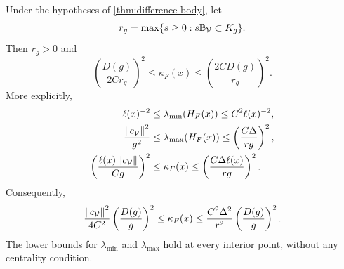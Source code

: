 \begin{theorem}
\label{thm:diameter-law}
Under the hypotheses of \cref{thm:difference-body}, let
\[
 r_g=\max\{s\geq0:s\mathbb B_{\mathcal V}\subset K_g\}.
\]
Then $r_g>0$ and
\begin{equation}
 \left(\frac{D(g)}{2C r_g}\right)^2
 \leq\kappa_F(x)\leq
 \left(\frac{2C D(g)}{r_g}\right)^2.
 \label{eq:aspect-law}
\end{equation}
More explicitly,
\begin{align}
 \ell(x)^{-2}&\leq\lambda_{\min}(H_F(x))
          \leq C^2\ell(x)^{-2},\label{eq:minimum-rigidity}\\
 \frac{\left\lVert c_{\mathcal V}\right\rVert^2}{g^2}
 &\leq\lambda_{\max}(H_F(x))
          \leq\left(\frac{C\Delta}{rg}\right)^2,\label{eq:maximum-rigidity}\\
 \left(\frac{\ell(x)\left\lVert c_{\mathcal V}\right\rVert}{Cg}\right)^2
 &\leq\kappa_F(x)
          \leq\left(\frac{C\Delta\ell(x)}{rg}\right)^2.
 \label{eq:chord-law}
\end{align}
Consequently,
\begin{equation}
 \frac{\left\lVert c_{\mathcal V}\right\rVert^2}{4C^2}\left(\frac{D(g)}{g}\right)^2
 \leq\kappa_F(x)\leq
 \frac{C^2\Delta^2}{r^2}\left(\frac{D(g)}{g}\right)^2.
 \label{eq:diameter-law}
\end{equation}
The lower bounds for $\lambda_{\min}$ and $\lambda_{\max}$ hold at
every interior point, without any centrality condition.
\end{theorem}

